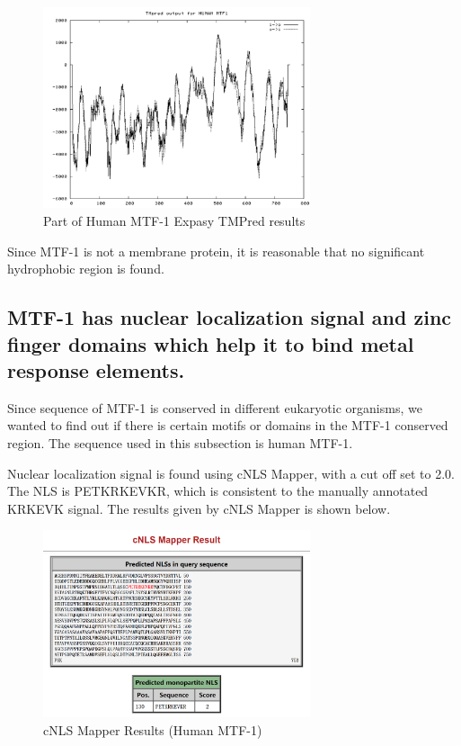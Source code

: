 \begin{figure}[H]
    \centering
    \includegraphics[width=0.7\textwidth]{image/TMPRED.png}
    \caption{Part of Human MTF-1 Expasy TMPred results}
    \label{TMPRED}
\end{figure}

Since MTF-1 is not a membrane protein, it is reasonable that no significant hydrophobic region is found.

\subsection{MTF-1 has nuclear localization signal and zinc finger domains which help it to bind metal response elements.}

Since sequence of MTF-1 is conserved in different eukaryotic organisms, we wanted to find out if there is certain motifs or domains in the MTF-1 conserved region. The sequence used in this subsection is human MTF-1.

Nuclear localization signal is found using cNLS Mapper, with a cut off set to 2.0. The NLS is PETKRKEVKR, which is consistent to the manually annotated KRKEVK signal. The results given by cNLS Mapper is shown below.

\begin{figure}[H]
    \centering
    \includegraphics[width=0.7\textwidth]{image/NLSP.png}
    \caption{cNLS Mapper Results (Human MTF-1)}
    \label{NLSP}
\end{figure}

